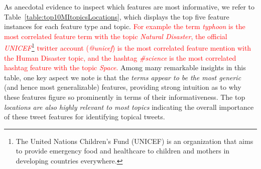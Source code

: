 As anecdotal evidence to inspect which features are most informative, we refer to
Table~\ref{table:top10MItopicsLocations}, which displays the top five feature instances
for each feature type and topic. \textcolor{red}{For example the term \textit{typhoon} is the most correlated feature term with the topic \textit{Natural Disaster}, the official \textit{UNICEF}\footnote{The United Nations Children's Fund (UNICEF) is an organization that aims to provide emergency food and healthcare to children and mothers in developing countries everywhere.} twitter account (\textit{@unicef}) is the most correlated feature mention with the Human Disaster topic, and the hashtag \textit{\#science} is the most correlated hashtag feature with the topic \textit{Space}.}
Among many remarkable insights in this table, one key aspect  
we note is that the \emph{terms appear to be the most generic} (and hence most generalizable) features,
providing strong intuition as to why these features figure so prominently in terms of
their informativeness.  The top \emph{locations are also highly relevant to most topics} indicating
the overall importance of these tweet features for identifying topical tweets.

